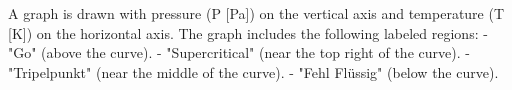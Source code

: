 A graph is drawn with pressure (P [Pa]) on the vertical axis and temperature (T [K]) on the horizontal axis. The graph includes the following labeled regions:  
- "Go" (above the curve).  
- "Supercritical" (near the top right of the curve).  
- "Tripelpunkt" (near the middle of the curve).  
- "Fehl Flüssig" (below the curve).